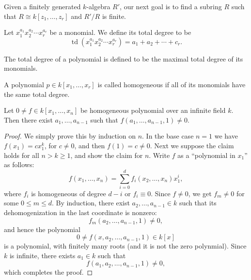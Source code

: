 \documentclass[11pt,a4paper]{article}
\DeclareMathOperator{\td}{td}
\begin{document}
\begin{remark}[Goal]
  Given a finitely generated $k$-algebra $R'$,
  our next goal is to find a subring $R$ such that
  $R \cong k[z_1,\dots,z_r]$ and $R'/R$ is finite.
\end{remark}

\begin{definition}
  Let $x_1^{a_1} x_2^{a_2} \cdots x_r^{a_r}$ be a monomial.
  We define its total degree to be
  \[
    \td(x_1^{a_1} x_2^{a_2} \cdots x_r^{a_r}) = a_1 + a_2 + \cdots + c_r.
  \]
\end{definition}

\begin{definition}
  The total degree of a polynomial
  is defined to be the maximal total degree of its monomials.
\end{definition}

\begin{definition}
  A polynomial $p \in k[x_1,\dots,x_r]$ is called homogeneous
  if all of its monomials have the same total degree.
\end{definition}

\begin{remark}
  
\end{remark}

\begin{lemma}
  \label{lem:nonzero}
  Let $0 \neq f \in k[x_1,\dots,x_n]$ be homogeneous polynomial
  over an infinite field $k$.
  Then there exist $a_1,\dots,a_{n-1}$ such that
  $f(a_1,\dots,a_{n-1},1) \neq 0$.
\end{lemma}
\begin{proof}
  We simply prove this by induction on $n$.
  In the base case $n = 1$ we have $f(x_1) = c x_1^k$, for $c \neq 0$,
  and then $f(1) = c \neq 0$.
  Next we suppose the claim holds for all $n > k \geq 1$,
  and show the claim for $n$.
  Write $f$ as a ``polynomial in $x_1$'' as follows:
  \[
    f(x_1,\dots,x_n) =
    \sum_{i=0}^{d} f_i(x_2,\dots,x_n) x_1^i,
  \]
  where $f_i$ is homogeneous of degree $d - i$ or $f_i \equiv 0$.
  Since $f \neq 0$, we get $f_m \neq 0$ for some $0 \le m \le d$.
  By induction, there exist $a_2,\dots,a_{n-1} \in k$
  such that its dehomogenization in the last coordinate is nonzero:
  \[
    f_m(a_2,\dots,a_{n-1},1) \neq 0,
  \]
  and hence the polynomial
  \[
    0 \neq f(x,a_2,\dots,a_{n-1},1) \in k[x]
  \]
  is a polynomial, with finitely many roots
  (and it is not the zero polynmial).
  Since $k$ is infinite, there exists $a_1 \in k$ such that
  \[
    f(a_1,a_2,\dots,a_{n-1},1) \neq 0,
  \]
  which completes the proof.
\end{proof}
\end{document}
